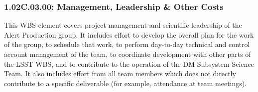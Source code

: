 \subsubsection*{1.02C.03.00: Management, Leadership \& Other Costs}

This WBS element covers project management and scientific leadership of the
Alert Production group. It includes effort to develop the overall plan for the
work of the group, to schedule that work, to perform day-to-day technical and
control account management of the team, to coordinate development with other
parts of the LSST WBS, and to contribute to the operation of the DM Subsystem
Science Team. It also includes effort from all team members which does not
directly contribute to a specific deliverable (for example, attendance at team
meetings).
